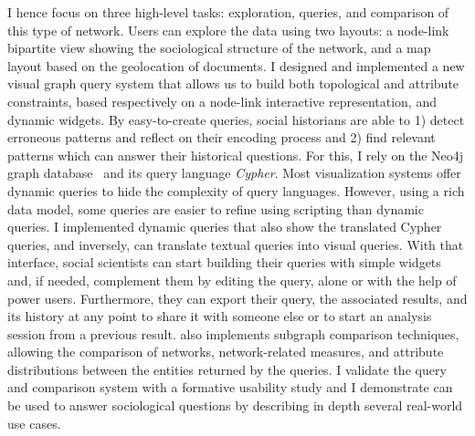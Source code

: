 I hence focus on three high-level tasks: exploration, queries, and comparison of this type of network.
Users can explore the data using two layouts: a node-link bipartite view showing the sociological structure of the network, and a map layout based on the geolocation of documents.
I designed and implemented a new visual graph query system that allows us to build both topological and attribute constraints, based respectively on a node-link interactive representation, and dynamic widgets.
By easy-to-create queries, social historians are able to 1) detect erroneous patterns and reflect on their encoding process and 2) find relevant patterns which can answer their historical questions.
For this, I rely on the Neo4j graph database~\cite{neo4j} and its query language \emph{Cypher}.
Most visualization systems offer dynamic queries to hide the complexity of query languages.
However, using a rich data model, some queries are easier to refine using scripting than dynamic queries.
I implemented dynamic queries that also show the translated Cypher queries, and inversely, can translate textual queries into visual queries.
With that interface, social scientists can start building their queries with simple widgets and, if needed, complement them by editing the query, alone or with the help of power users.
Furthermore, they can export their query, the associated results, and its history at any point to share it with someone else or to start an analysis session from a previous result.
\name also implements subgraph comparison techniques, allowing the comparison of networks, network-related measures, and attribute distributions between the entities returned by the queries.
I validate the query and comparison system with a formative usability study and I demonstrate \name can be used to answer sociological questions by describing in depth several real-world use cases.


